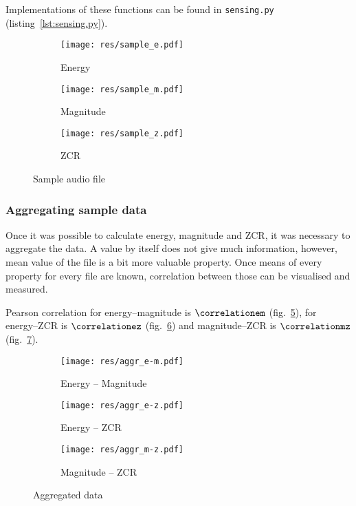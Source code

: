 \documentclass[english,11pt]{article}
\numberwithin{equation}{section}
\begin{document}
Implementations of these functions can be found in \texttt{sensing.py}
(listing~\ref{lst:sensing.py}).

\begin{figure}
    \centering
    \begin{subfigure}[b]{0.6\textwidth}
        \texttt{[image: res/sample\_e.pdf]}
        \caption{Energy}
        \label{fig:sample_e}
    \end{subfigure}

    \begin{subfigure}[b]{0.6\textwidth}
        \texttt{[image: res/sample\_m.pdf]}
        \caption{Magnitude}
        \label{fig:sample_m}
    \end{subfigure}

    \begin{subfigure}[b]{0.6\textwidth}
        \texttt{[image: res/sample\_z.pdf]}
        \caption{ZCR}
        \label{fig:sample_z}
    \end{subfigure}
    \caption{Sample audio file}\label{fig:sample}
\end{figure}

\subsubsection{Aggregating sample data}
\label{sec:aggregating}

Once it was possible to calculate energy, magnitude and ZCR, it was necessary
to aggregate the data. A value by itself does not give much information,
however, mean value of the file is a bit more valuable property. Once means of
every property for every file are known, correlation between those can be
visualised and measured.

Pearson correlation for energy--magnitude is $\correlationem$
(fig.~\ref{fig:aggr_e-m}), for energy--ZCR is $\correlationez$
(fig.~\ref{fig:aggr_e-z}) and magnitude--ZCR is $\correlationmz$
(fig.~\ref{fig:aggr_m-z}).

\begin{figure}
    \centering
    \begin{subfigure}[b]{0.6\textwidth}
        \texttt{[image: res/aggr\_e-m.pdf]}
        \caption{Energy -- Magnitude}
        \label{fig:aggr_e-m}
    \end{subfigure}

    \begin{subfigure}[b]{0.6\textwidth}
        \texttt{[image: res/aggr\_e-z.pdf]}
        \caption{Energy -- ZCR}
        \label{fig:aggr_e-z}
    \end{subfigure}

    \begin{subfigure}[b]{0.6\textwidth}
        \texttt{[image: res/aggr\_m-z.pdf]}
        \caption{Magnitude -- ZCR}
        \label{fig:aggr_m-z}
    \end{subfigure}
    \caption{Aggregated data}\label{fig:aggr}
\end{figure}
\end{document}
